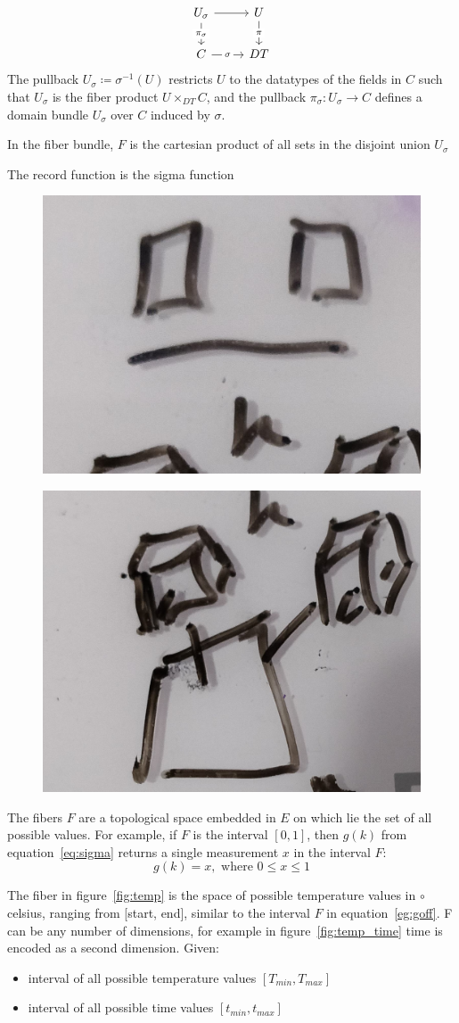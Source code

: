 \documentclass[../main.tex]{subfiles}
\begin{document}
\begin{equation}
    \begin{tikzcd}
            U_{\sigma} \arrow[d, "\pi_{\sigma}" description] \arrow[r] & U \arrow[d, "\pi" description] \\
            C \arrow[r, "\sigma" description]                          & DT                            
    \end{tikzcd}
\end{equation}
The pullback $U_{\sigma} \coloneqq \sigma^{-1}(U)$ restricts $U$ to the datatypes of the fields in $C$ such that $U_{\sigma}$ is the fiber product $U \times_{DT} C$, and the pullback $\pi_{\sigma}:U_{\sigma} \rightarrow C$ defines a domain bundle $U_{\sigma}$ over $C$ induced by $\sigma$.




In the fiber bundle, $F$ is the cartesian product of all sets in the disjoint union $U_{\sigma}$

The record function is the sigma function


\begin{figure}[ht]
    \includegraphics[width=0.2\linewidth]{figures/sections/math/temp_2f.png}
    \label{fig:}
\end{figure}
\begin{figure}[ht]
    \includegraphics[width=0.2\linewidth]{figures/sections/math/temp_3f.png}
\end{figure}


The fibers $F$ are a topological space embedded in $E$ on which lie the set of all possible values. For example, if $F$ is the interval $[0, 1]$, then $g(k)$ from equation~\ref{eq:sigma} returns a single measurement $x$ in the interval $F$:
\begin{equation}
    \label{eg:goff}
    g(k) = x, \text{ where } 0\leq x \leq 1
\end{equation}

The fiber in figure~\ref{fig:temp} is the space of possible temperature values in $\circ$ celsius, ranging from [start, end], similar to the interval $F$ in equation~\ref{eg:goff}. F can be any number of dimensions, for example in figure~\ref{fig:temp_time} time is encoded as a second dimension. Given:
\begin{itemize}
\item interval of all possible temperature values $[T_{min}, T_{max}]$ 
\item interval of all possible time values $[t_{min}, t_{max}]$
\end{itemize}
\end{document}

